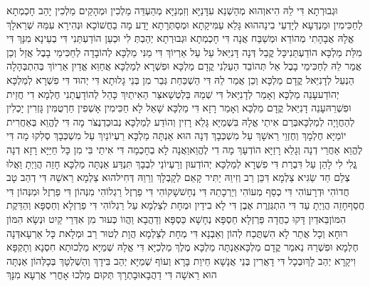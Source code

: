 \documentclass[../main/main.tex]{subfiles}
\begin{document}
\begin{multicols*}{\ncols}
וּגְבוּרְתָא דִּי לֵהּ הִיא\PreVerseSpace{}וְהוּא מְהַשְׁנֵא עִדָּנַיָּא וְזִמְנַיָּא מְהַעְדֵּה מַלְכִין וּמְהָקֵים מַלְכִין יָהֵב חָכְמְתָא לְחַכִּימִין וּמַנְדְּעָא לְיָדְעֵי בִינָה\PreVerseSpace{}הוּא גָּלֵא עַמִּיקָתָא וּמְסַתְּרָתָא יָדַע מָה בַחֲשׁוֹכָא וּנְהִירָא עִמֵּהּ שְׁרֵא\PreVerseSpace{}לָךְ אֱלָהּ אֲבָהָתִי מְהוֹדֵא וּמְשַׁבַּח אֲנָה דִּי חָכְמְתָא וּגְבוּרְתָא יְהַבְתְּ לִי וּכְעַן הוֹדַעְתַּנִי דִּי בְעֵינָא מִנָּךְ דִּי מִלַּת מַלְכָּא הוֹדַעְתַּנִי\SubEnd{}\PreVerseSpace{}כָּל קֳבֵל דְּנָה דָּנִיֵּאל עַל עַל אַרְיוֹךְ דִּי מַנִּי מַלְכָּא לְהוֹבָדָה לְחַכִּימֵי בָבֶל אֲזַל וְכֵן אֲמַר לֵהּ לְחַכִּימֵי בָבֶל אַל תְּהוֹבֵד הַעֵלְנִי קֳדָם מַלְכָּא וּפִשְׁרָא לְמַלְכָּא אֲחַוֵּא \ClosedSection{}אֱדַיִן אַרְיוֹךְ בְּהִתְבְּהָלָה הַנְעֵל לְדָנִיֵּאל קֳדָם מַלְכָּא וְכֵן אֲמַר לֵהּ דִּי הַשְׁכַּחַת גְּבַר מִן בְּנֵי גָלוּתָא דִּי יְהוּד דִּי פִשְׁרָא לְמַלְכָּא יְהוֹדַע\PreVerseSpace{}עָנֵה מַלְכָּא וְאָמַר לְדָנִיֵּאל דִּי שְׁמֵהּ בֵּלְטְשַׁאצַּר הַאִיתַיִךְ כָּהֵל לְהוֹדָעֻתַנִי חֶלְמָא דִי חֲזֵית וּפִשְׁרֵהּ\PreVerseSpace{}עָנֵה דָנִיֵּאל קֳדָם מַלְכָּא וְאָמַר רָזָא דִּי מַלְכָּא שָׁאֵל לָא חַכִּימִין אָשְׁפִין חַרְטֻמִּין גָּזְרִין יָכְלִין לְהַחֲוָיָה לְמַלְכָּא\PreVerseSpace{}בְּרַם אִיתַי אֱלָהּ בִּשְׁמַיָּא גָּלֵא רָזִין וְהוֹדַע לְמַלְכָּא נְבוּכַדְנֶצֹּר מָה דִּי לֶהֱוֵא בְּאַחֲרִית יוֹמַיָּא חֶלְמָךְ וְחֶזְוֵי רֵאשָׁךְ עַל מִשְׁכְּבָךְ דְּנָה הוּא \ClosedSection{}אַנְתָּה מַלְכָּא רַעְיוֹנַיִךְ\SubEnd{} עַל מִשְׁכְּבָךְ סְלִקוּ מָה דִּי לֶהֱוֵא אַחֲרֵי דְנָה וְגָלֵא רָזַיָּא הוֹדְעָךְ מָה דִי לֶהֱוֵא\PreVerseSpace{}וַאֲנָה לָא בְחָכְמָה דִּי אִיתַי בִּי מִן כָּל חַיַּיָּא רָזָא דְנָה גֱּלִי לִי לָהֵן עַל דִּבְרַת דִּי פִשְׁרָא לְמַלְכָּא יְהוֹדְעוּן וְרַעְיוֹנֵי לִבְבָךְ תִּנְדַּע \ClosedSection{}אַנְתָּה מַלְכָּא חָזֵה הֲוַיְתָ וַאֲלוּ צְלֵם חַד שַׂגִּיא צַלְמָא דִּכֵּן רַב וְזִיוֵהּ יַתִּיר קָאֵם לְקָבְלָךְ וְרֵוֵהּ דְּחִיל\PreVerseSpace{}הוּא צַלְמָא רֵאשֵׁהּ דִּי דְהַב טָב חֲדוֹהִי וּדְרָעוֹהִי דִּי כְסַף מְעוֹהִי וְיַרְכָתֵהּ דִּי נְחָשׁ\PreVerseSpace{}שָׁקוֹהִי דִּי פַרְזֶל רַגְלוֹהִי מִנְּהוֹן דִּי פַרְזֶל וּמִנְּהוֹן דִּי חֲסַף\PreVerseSpace{}חָזֵה הֲוַיְתָ עַד דִּי הִתְגְּזֶרֶת אֶבֶן דִּי לָא בִידַיִן וּמְחָת לְצַלְמָא עַל רַגְלוֹהִי דִּי פַרְזְלָא וְחַסְפָּא וְהַדֵּקֶת הִמּוֹן\PreVerseSpace{}בֵּאדַיִן דָּקוּ כַחֲדָה פַּרְזְלָא חַסְפָּא נְחָשָׁא כַּסְפָּא וְדַהֲבָא וַהֲווֹ כְּעוּר מִן אִדְּרֵי קַיִט וּנְשָׂא הִמּוֹן רוּחָא וְכָל אֲתַר לָא הִשְׁתֲּכַח לְהוֹן וְאַבְנָא דִּי מְחָת לְצַלְמָא הֲוָת לְטוּר רַב וּמְלָאת כָּל אַרְעָא\PreVerseSpace{}דְּנָה חֶלְמָא וּפִשְׁרֵהּ נֵאמַר קֳדָם מַלְכָּא\PreVerseSpace{}אַנְתָּה מַלְכָּא מֶלֶךְ מַלְכַיָּא דִּי אֱלָהּ שְׁמַיָּא מַלְכוּתָא חִסְנָא וְתָקְפָּא וִיקָרָא יְהַב לָךְ\PreVerseSpace{}וּבְכָל דִּי דָאֲרִין בְּנֵי אֲנָשָׁא חֵיוַת בָּרָא וְעוֹף שְׁמַיָּא יְהַב בִּידָךְ וְהַשְׁלְטָךְ בְּכָלְּהוֹן אַנְתָּה הוּא רֵאשָׁה דִּי דַהֲבָא\PreVerseSpace{}וּבָתְרָךְ תְּקוּם מַלְכוּ אָחֳרִי אֲרְעָא מִנָּךְ 
\end{multicols*}
\end{document}
